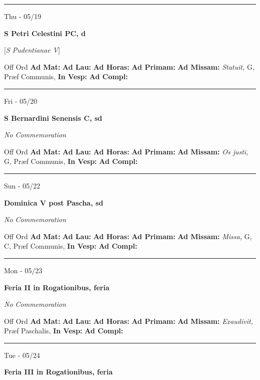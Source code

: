 \documentclass[letterpaper, 10pt]{article}
\begin{document}
\hrule
\begin{center}
Thu - 05/19
\end{center}\textbf{ \large S Petri Celestini PC, \textnormal{\normalsize d}}

[\textit{S Pudentianae V}]
\begin{justify}
Off Ord
\textbf{Ad Mat: }
\textbf{Ad Lau: }
\textbf{Ad Horas: }
\textbf{Ad Primam: }
\textbf{Ad Missam:} \textit{Statuit, } G, Præf Communis, 
\textbf{In Vesp: }
\textbf{Ad Compl: }\end{justify}



\hrule
\begin{center}
Fri - 05/20
\end{center}\textbf{ \large S Bernardini Senensis C, \textnormal{\normalsize sd}}

\textit{No Commemoration}\begin{justify}
Off Ord
\textbf{Ad Mat: }
\textbf{Ad Lau: }
\textbf{Ad Horas: }
\textbf{Ad Primam: }
\textbf{Ad Missam:} \textit{Os justi, } G, Præf Communis, 
\textbf{In Vesp: }
\textbf{Ad Compl: }\end{justify}



\hrule
\begin{center}
Sun - 05/22
\end{center}\textbf{ \large Dominica V post Pascha, \textnormal{\normalsize sd}}

\textit{No Commemoration}\begin{justify}
Off Ord
\textbf{Ad Mat: }
\textbf{Ad Lau: }
\textbf{Ad Horas: }
\textbf{Ad Primam: }
\textbf{Ad Missam:} \textit{Missa, } G, C, Præf Communis, 
\textbf{In Vesp: }
\textbf{Ad Compl: }\end{justify}



\hrule
\begin{center}
Mon - 05/23
\end{center}\textbf{ \large Feria II in Rogationibus, \textnormal{\normalsize feria}}

\textit{No Commemoration}\begin{justify}
Off Ord
\textbf{Ad Mat: }
\textbf{Ad Lau: }
\textbf{Ad Horas: }
\textbf{Ad Primam: }
\textbf{Ad Missam:} \textit{Exaudivit, } Præf Paschalis, 
\textbf{In Vesp: }
\textbf{Ad Compl: }\end{justify}



\hrule
\begin{center}
Tue - 05/24
\end{center}\textbf{ \large Feria III in Rogationibus, \textnormal{\normalsize feria}}
\end{document}
